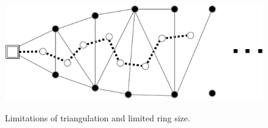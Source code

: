 \begin{figure}[h]
	\begin{centering}
		{\includegraphics[scale=0.9]{figures/approach/trifail.pdf}}
		\caption[Limited ring size]{Limitations of triangulation and limited ring size.}
		\label{fig:trifail}
	\end{centering}
\end{figure}
